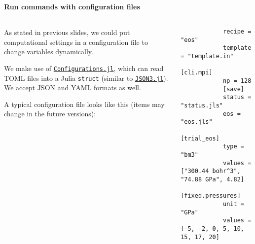 \begin{frame}
    \frametitle{\subsecname}
    \framesubtitle{Run commands with configuration files}

    \begin{columns}[t]
        \begin{column}{0.4\textwidth}
            As stated in previous slides, we could put computational settings
            in a configuration file to change variables dynamically.

            We make use of
            \href{https://github.com/Roger-luo/Configurations.jl}{\texttt{Configurations.jl}},
            which can read TOML files into a Julia \texttt{struct}
            (similar to \href{https://github.com/quinnj/JSON3.jl}{\texttt{JSON3.jl}}).
            We accept JSON and YAML formats as well.

            A typical configuration file looks like this (items may change in the future versions):
        \end{column}

        \begin{column}{0.6\textwidth}
            \begin{verbatim}
            recipe = "eos"
            template = "template.in"
            [cli.mpi]
            np = 128
            [save]
            status = "status.jls"
            eos = "eos.jls"
            [trial_eos]
            type = "bm3"
            values = ["300.44 bohr^3", "74.88 GPa", 4.82]
            [fixed.pressures]
            unit = "GPa"
            values = [-5, -2, 0, 5, 10, 15, 17, 20]
        \end{verbatim}
        \end{column}
    \end{columns}

\end{frame}
